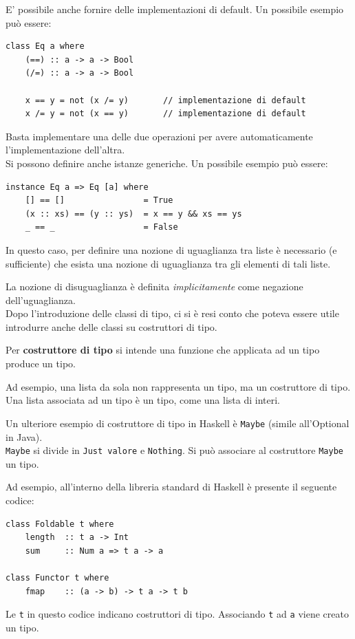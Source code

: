 \documentclass{article}
\begin{document}
E' possibile anche fornire delle implementazioni di default. Un possibile esempio può essere:
\begin{tcolorbox}
\begin{verbatim}
class Eq a where
    (==) :: a -> a -> Bool
    (/=) :: a -> a -> Bool

    x == y = not (x /= y)       // implementazione di default
    x /= y = not (x == y)       // implementazione di default
\end{verbatim}
\end{tcolorbox}
Basta implementare una delle due operazioni per avere automaticamente l’implementazione dell’altra.\vspace{14pt}\\
Si possono definire anche istanze generiche. Un possibile esempio può essere:
\begin{tcolorbox}
\begin{verbatim}
instance Eq a => Eq [a] where
    [] == []                = True
    (x :: xs) == (y :: ys)  = x == y && xs == ys
    _ == _                  = False
\end{verbatim}
\end{tcolorbox}
In questo caso, per definire una nozione di uguaglianza tra liste è necessario (e sufficiente) che esista una nozione di uguaglianza tra gli elementi di tali liste.

La nozione di disuguaglianza è definita \textit{implicitamente} come negazione dell’uguaglianza.\vspace{14pt}\\
Dopo l'introduzione delle classi di tipo, ci si è resi conto che poteva essere utile introdurre anche delle classi su costruttori di tipo.

Per \textbf{costruttore di tipo} si intende una funzione che applicata ad un tipo produce un tipo.

Ad esempio, una lista da sola non rappresenta un tipo, ma un costruttore di tipo.\\
Una lista associata ad un tipo è un tipo, come una lista di interi.

Un ulteriore esempio di costruttore di tipo in Haskell è \texttt{Maybe} (simile all'Optional in Java).\\
\texttt{Maybe} si divide in \texttt{Just valore} e \texttt{Nothing}. Si può associare al costruttore \texttt{Maybe} un tipo.

Ad esempio, all'interno della libreria standard di Haskell è presente il seguente codice:
\begin{tcolorbox}
\begin{verbatim}
class Foldable t where
    length  :: t a -> Int
    sum     :: Num a => t a -> a

class Functor t where
    fmap    :: (a -> b) -> t a -> t b
\end{verbatim}
\end{tcolorbox}
Le \texttt{t} in questo codice indicano costruttori di tipo. Associando \texttt{t} ad \texttt{a} viene creato un tipo.
\end{document}
